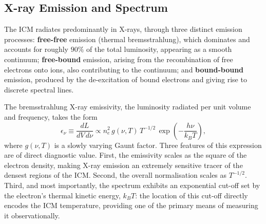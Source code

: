 \subsection{X-ray Emission and Spectrum} \label{subsec:icm_spectrum}

The ICM radiates predominantly in X-rays, through three distinct emission processes: \textbf{free-free} emission (thermal bremsstrahlung), which dominates and accounts for roughly $90\%$ of the total luminosity, appearing as a smooth continuum; \textbf{free-bound} emission, arising from the recombination of free electrons onto ions, also contributing to the continuum; and \textbf{bound-bound} emission, produced by the de-excitation of bound electrons and giving rise to discrete spectral lines.

\medskip

The bremsstrahlung X-ray emissivity, the luminosity radiated per unit volume and frequency, takes the form
$$
\epsilon_\nu \equiv \frac{dL}{dV\,d\nu} \propto n_e^2\, g(\nu,T)\, T^{-1/2}\, \exp\!\left(-\frac{h\nu}{k_B T}\right) ,
$$
where $g(\nu,T)$ is a slowly varying Gaunt factor. Three features of this expression are of direct diagnostic value. First, the emissivity scales as the square of the electron density, making X-ray emission an extremely sensitive tracer of the densest regions of the ICM. Second, the overall normalisation scales as $T^{-1/2}$. Third, and most importantly, the spectrum exhibits an exponential cut-off set by the electron's thermal kinetic energy, $k_B T$: the location of this cut-off directly encodes the ICM temperature, providing one of the primary means of measuring it observationally.

\medskip

